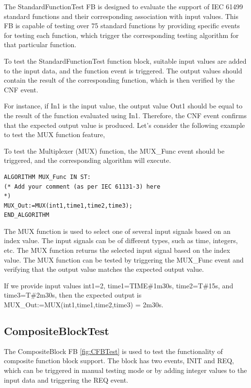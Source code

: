 \documentclass[conference]{IEEEtran}
\begin{document}
The StandardFunctionTest FB is designed to evaluate the support of IEC 61499 standard functions and their corresponding association with input values. This FB is capable of testing over 75 standard functions by providing specific events for testing each function, which trigger the corresponding testing algorithm for that particular function.

To test the StandardFunctionTest function block, suitable input values are added to the input data, and the function event is triggered. The output values should contain the result of the corresponding function, which is then verified by the CNF event.

For instance, if In1 is the input value, the output value Out1 should be equal to the result of the function evaluated using In1. Therefore, the CNF event confirms that the expected output value is produced. Let's consider the following example to test the MUX function feature,


To test the Multiplexer (MUX) function, the MUX\_Func event should be triggered, and the corresponding algorithm will execute.

\begin{lstlisting} 
ALGORITHM MUX_Func IN ST:
(* Add your comment (as per IEC 61131-3) here
*)
MUX_Out:=MUX(int1,time1,time2,time3);
END_ALGORITHM
\end{lstlisting}




The MUX function is used to select one of several input signals based on an index value. The input signals can be of different types, such as time, integers, etc. The MUX function returns the selected input signal based on the index value. The MUX function can be tested by triggering the MUX\_Func event and verifying that the output value matches the expected output value.

If we provide input values int1=2, time1=TIME\#1m30s, time2=T\#15s, and time3=T\#2m30s, then the expected output is MUX\_Out:=MUX(int1,time1,time2,time3) = 2m30s.


\subsection{CompositeBlockTest}

The CompositeBlock FB \ref{fig:CFBTest} is used to test the functionality of composite function block support. The block has two events, INIT and REQ, which can be triggered in manual testing mode or by adding integer values to the input data and triggering the REQ event.
\end{document}
